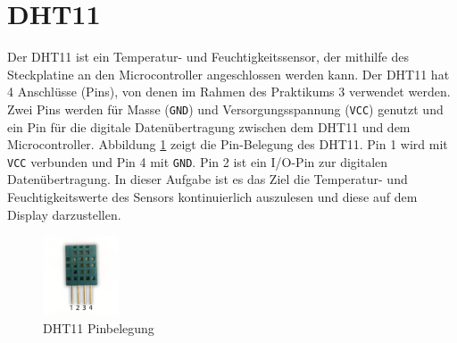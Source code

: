 \section{\ExercisePrefixEmbeddedC DHT11 \optional}

\optionaltextbox

Der DHT11 ist ein Temperatur- und Feuchtigkeitssensor, der mithilfe des Steckplatine an den Microcontroller angeschlossen werden kann.
Der DHT11 hat 4 Anschlüsse (Pins), von denen im Rahmen des Praktikums 3 verwendet werden.
Zwei Pins werden für Masse (\lstinline|GND|) und Versorgungsspannung (\lstinline|VCC|) genutzt und ein Pin für die digitale Datenübertragung zwischen dem DHT11 und dem Microcontroller.
Abbildung \ref{fig:dht11Pins} zeigt die Pin-Belegung des DHT11.
Pin 1 wird mit \lstinline|VCC| verbunden und Pin 4 mit \lstinline|GND|.
Pin 2 ist ein I/O-Pin zur digitalen Datenübertragung.
In dieser Aufgabe ist es das Ziel die Temperatur- und Feuchtigkeitswerte des Sensors kontinuierlich auszulesen und diese auf dem Display darzustellen.
\begin{figure}[!htb]
	\centering
	\includegraphics[width=0.2\textwidth]{./05_c/figures/DHT11.png}
	\caption{DHT11 Pinbelegung}
	\label{fig:dht11Pins}
\end{figure} 

